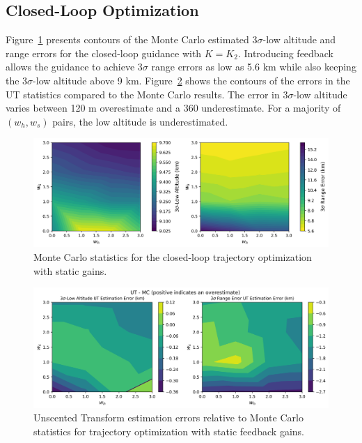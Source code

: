 \subsection{Closed-Loop Optimization}
Figure~\ref{Fig:MCResultsFixedGain} presents contours of the Monte Carlo estimated 3$\sigma$-low altitude and range errors for the closed-loop guidance with $K=K_2$. Introducing feedback allows the guidance to achieve 3$\sigma$ range errors as low as 5.6 km while also keeping the 3$\sigma$-low altitude above 9 km. Figure~\ref{Fig:MCErrorsFixedGain} shows the contours of the errors in the UT statistics compared to the Monte Carlo results. The error in 3$\sigma$-low altitude varies between 120 m overestimate and a 360 underestimate. For a majority of $(w_h,w_s)$ pairs, the low altitude is underestimated. 
\begin{figure}[h!]
	\centering
	\includegraphics[width=1\textwidth]{Images/Reestimated_WeightSweepMCResults}
	\caption{Monte Carlo statistics for the closed-loop trajectory optimization with static gains.}
	\label{Fig:MCResultsFixedGain}
\end{figure}
\begin{figure}[h!]
	\centering
	\includegraphics[width=1\textwidth]{Images/Reestimated_WeightSweepError}
	\caption{Unscented Transform estimation errors relative to Monte Carlo statistics for trajectory optimization with static feedback gains.}
	\label{Fig:MCErrorsFixedGain}
\end{figure}


